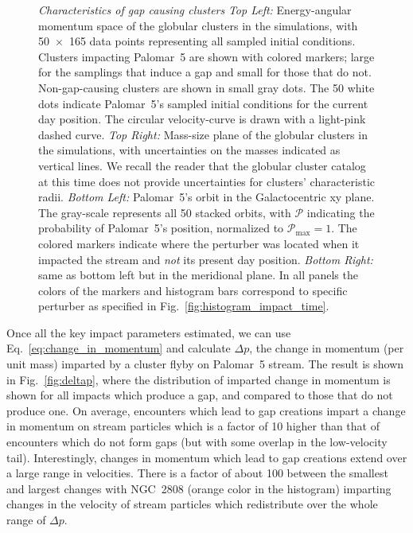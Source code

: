 \documentclass[draft]{aa}
\begin{document}
\begin{figure}
      \caption{\textit{Characteristics of gap causing clusters} \textit{Top Left:} Energy-angular momentum space of the globular clusters in the simulations, with 50~$\times$~165 data points representing all sampled initial conditions. Clusters impacting Palomar~5 are shown with colored markers; large for the samplings that induce a gap and small for those that do not. Non-gap-causing clusters are shown in small gray dots. The 50 white dots indicate Palomar~5's sampled initial conditions for the current day position. The circular velocity-curve is drawn with a light-pink dashed curve. \textit{Top Right:} Mass-size plane of the globular clusters in the simulations, with uncertainties on the masses indicated as vertical lines. We recall the reader that the globular cluster catalog at this time does not provide uncertainties for clusters' characteristic radii. \textit{Bottom Left:} Palomar~5's orbit in the Galactocentric xy plane. The gray-scale represents all 50 stacked orbits, with $\mathcal{P}$ indicating the probability of Palomar~5's position, normalized to $\mathcal{P}_\textrm{max}=1$. The colored markers indicate where the perturber was located when it impacted the stream and \textit{not} its present day position. \textit{Bottom Right:} same as bottom left but in the meridional plane. In all panels the colors of the markers and histogram bars correspond to specific perturber as specified in Fig.~\ref{fig:histogram_impact_time}.}
      \label{fig:mass_size_plane}
    \end{figure}

      
    Once all the key impact parameters estimated, we can use Eq.~\ref{eq:change_in_momentum} and calculate $\Delta p$, the change in momentum (per unit mass) imparted by a cluster flyby on Palomar~5 stream. The result  is shown in Fig.~\ref{fig:deltap}, where the distribution of imparted change in momentum is shown for all impacts which produce a gap, and compared to those that do not produce one. On average, encounters which lead to gap creations impart a change in momentum on stream particles which is a factor of 10 higher than that of encounters which do not form gaps (but with some overlap in the low-velocity tail). Interestingly, changes in momentum which lead to gap creations extend over a large range in velocities. There is a factor of about 100 between the smallest and largest changes with NGC~2808 (orange color in the histogram) imparting changes in the velocity of stream particles which redistribute over the whole range of $\Delta p$. 
\end{document}
